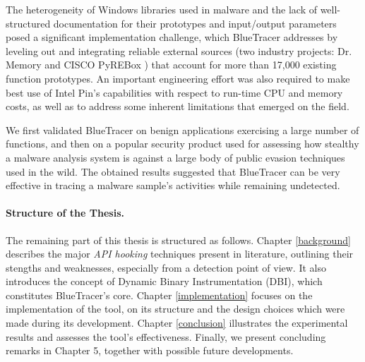 The heterogeneity of Windows libraries used in malware and the lack of well-structured documentation for their prototypes and input/output parameters posed a significant implementation challenge, which BlueTracer addresses by leveling out and integrating reliable external sources (two industry projects: Dr. Memory \cite{DrMemory} and CISCO PyREBox \cite{Pyrebox}) that account for more than 17,000 existing function prototypes. An important engineering effort was also required to make best use of Intel Pin’s capabilities with respect to run-time CPU and memory costs, as well as to address some inherent limitations that emerged on the field.

We first validated BlueTracer on benign applications exercising a large number of functions, and then on a popular security product used for assessing how stealthy a malware analysis system is against a large body of public evasion techniques used in the wild. The obtained results suggested that BlueTracer can be very effective in tracing a malware sample's activities while remaining undetected. 
\iffalse
I then analyzed a set of highly evasive samples collected by Joe Security, the proclaimed technology leader for the analysis of evasive malware, as they feature exotic evasions that most analysis products have struggled to deal with. The logs collected by BlueTracer reveal behaviors consistent with the analysis reports authored by Joe Security, suggesting that BlueTracer can be very effective in tracing a malware sample's activities while remaining undetected. 
\fi               

\paragraph{Structure of the Thesis.}
The remaining part of this thesis is structured as follows.
Chapter \ref{background} describes the major \textit{API hooking} techniques present in literature, outlining their stengths and weaknesses, especially from a detection point of view. It also introduces the concept of Dynamic Binary Instrumentation (DBI), which constitutes BlueTracer's core.
Chapter \ref{implementation} focuses on the implementation of the tool, on its structure and the design choices which were made during its development.
Chapter \ref{conclusion} illustrates the experimental results and assesses the tool's effectiveness.
Finally, we present concluding remarks in Chapter 5, together with possible future developments.
